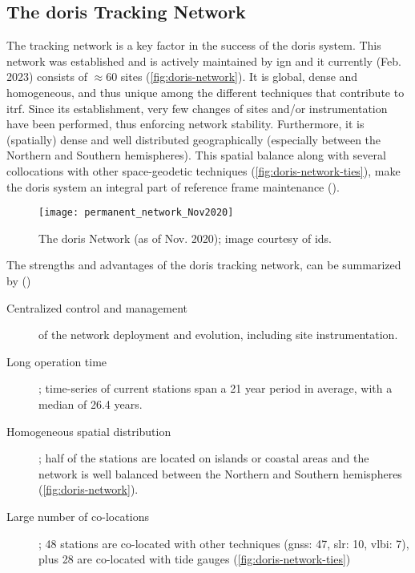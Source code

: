 \iffalse
\begin{description}
  \item[Atmospheric Studies] including troposphere () and ionosphere ()
  \item[Reference Frames] \cite{Willis2007}
  \item[Space Weather and Solar Activity] \cite{Willis2005}
  \item[Tectonics] \cite{}
\end{description}
\fi

\subsection{The \gls{doris} Tracking Network}\label{ssec:doris-tracking-network}
The tracking network is a key factor in the success of the \gls{doris} system. 
This network was established and is actively maintained by \gls{ign} and it currently 
(Feb. 2023) consists of $\approx 60$ sites (\autoref{fig:doris-network}). It is global, dense 
and homogeneous, and thus unique among the different techniques that contribute to 
\gls{itrf}. Since its establishment, very few changes of sites and/or instrumentation 
have been performed, thus enforcing network stability. Furthermore, it is (spatially) 
dense and well distributed geographically (especially between the Northern and  
Southern hemispheres). This spatial balance along with several collocations with 
other space-geodetic techniques (\autoref{fig:doris-network-ties}), make the 
\gls{doris} system an integral part of reference frame maintenance (\cite{Moreaux2022}).

\begin{figure}[h]
  \centering
  \texttt{[image: permanent\_network\_Nov2020]}
  \caption{The \gls{doris} Network (as of Nov. 2020); image courtesy of \gls{ids}.}
  \label{fig:doris-network}
\end{figure}

The strengths and advantages of the \gls{doris} tracking network, can be summarized 
by (\cite{Soudarin2019})
\begin{description}
  \item[Centralized control and management] of the network deployment and evolution, 
    including site instrumentation.
  \item[Long operation time]; time-series of current stations span a 21 year period in average, 
    with a median of 26.4 years.
  \item[Homogeneous spatial distribution]; half of the stations are located on 
    islands or coastal areas and the network is well balanced between the 
    Northern and Southern hemispheres (\autoref{fig:doris-network}).
  \item[Large number of co-locations]; 48 stations are co-located with 
    other techniques (\gls{gnss}: 47, \gls{slr}: 10, \gls{vlbi}: 7), plus 28 are 
    co-located with tide gauges (\autoref{fig:doris-network-ties})
\end{description}

